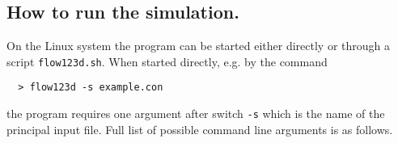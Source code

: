 \documentclass[12pt,a4paper]{report}
\begin{document}
\subsection{How to run the simulation.}
On the Linux system the program can be started either directly or through a script \verb'flow123d.sh'. When started directly, e.g. by the command
\begin{verbatim}
  > flow123d -s example.con
\end{verbatim}
the program requires one argument after switch \verb'-s' which is the name of the principal input file. Full list of possible command line arguments is as follows.

\end{document}
